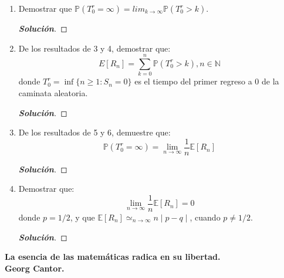 \documentclass[12pt, letterpaper]{article}
\newcommand{\p}{\mathbb{P}}
\newenvironment{manualtheorem}[1]{%
  \renewcommand\themanualtheoreminner{#1}%
  \manualtheoreminner
}{\endmanualtheoreminner}
\newenvironment{solucion}
  {\renewcommand\qedsymbol{$\square$}\begin{proof}[\textbf{Solución}]}
  {\end{proof}}
\begin{document}
\begin{manualtheorem}{4.2}
\begin{enumerate}
        \item Demostrar que  $\p(T^{r}_0=\infty)={lim}_{k\rightarrow \infty}\p(T^{r}_{0}>k)$.
        \begin{solucion}
        \end{solucion}
        
        \item De los resultados de 3 y 4, demostrar que:
        $$E[R_n]=\sum^{n}_{k=0}\p(T^{r}_{0}>k), n\in \mathbb{N} $$
        donde $T^{r}_{0}=\inf \{ n\geq 1:S_n=0\}$ es el tiempo del primer regreso a 0 de la caminata aleatoria.
        \begin{solucion}
        \end{solucion}
        
        \item De los resultados de 5 y 6, demuestre que:
        $$\p(T^{r}_{0}=\infty)=\lim_{n\rightarrow\infty}\frac{1}{n}\mathbb{E}[R_n]$$
        \begin{solucion}
        \end{solucion}
        
        \item Demostrar que:
        $$ {\lim_{n\rightarrow\infty}\frac{1}{n}\mathbb{E}[R_n]=0}$$ donde $p=1/2$, y que $\mathbb{E}[R_n]\simeq_{n\rightarrow \infty} n \mid p-q \mid $, cuando $p\neq1/2$.
        \begin{solucion}
        \end{solucion}
    \end{enumerate}
    \end{manualtheorem}
    \begin{center}
        {\small  \bfseries La esencia de las matemáticas radica en su libertad. \\Georg Cantor.}
    \end{center}
\end{document}
